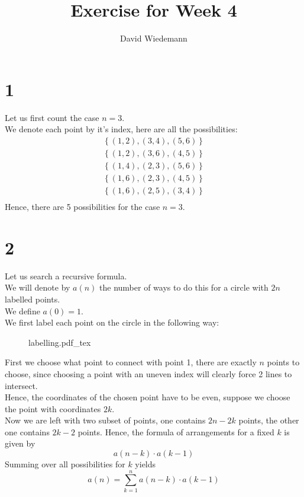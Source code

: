 \documentclass[11pt, a4paper, twoside]{article}
\newcommand{\incfig}[1]{%
    \def\svgwidth{\columnwidth}
    {#1.pdf_tex}
}
\begin{document}
\title{Exercise for Week 4}
\author{David Wiedemann}
\maketitle
\section*{1}
Let us first count the case $n=3$.\\
We denote each point by it's index, here are all the possibilities:
\begin{align*}
	\left\{ ( 1,2), ( 3,4), ( 5,6)  \right\} \\
	\left\{ ( 1,2), ( 3,6), ( 4,5)  \right\} \\
	\left\{ ( 1,4) , ( 2,3) , ( 5,6)  \right\} \\
	\left\{ ( 1,6) , ( 2,3) , ( 4,5)  \right\} \\
	\left\{ ( 1,6) , ( 2,5) , ( 3,4)  \right\} \\
\end{align*}
Hence, there are 5 possibilities for the case $n=3$.


\section*{2}
Let us search a recursive formula.\\
We will denote by $a( n) $ the number of ways to do this for a circle with $2n$ labelled points.\\
We define $a( 0) =1 $.\\

We first label each point on the circle in the following way:

\begin{figure}[ht]
    \incfig{labelling}
\end{figure}


First we choose what point to connect with point 1, there are exactly $n$ points to choose, since choosing a point with an uneven index will clearly force 2 lines to intersect.\\
Hence, the coordinates of the chosen point have to be even, suppose we choose the point with coordinates $2k$.\\
Now we are left with two subset of points, one contains $2n -2k$ points, the other one contains $2k-2$ points.
Hence, the formula of arrangements for a fixed $k $ is given by
\[ 
	a( n-k) \cdot a( k-1) 
\]
Summing over all possibilities for $k$ yields
\[ 
a(n) =\sum_{k=1}^{n} a( n-k) \cdot a(k-1) 
\]
\end{document}
